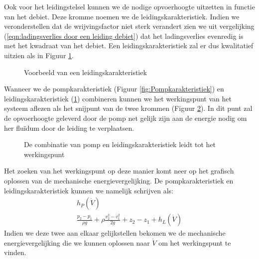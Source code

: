Ook voor het leidingstelsel kunnen we de nodige opvoerhoogte uitzetten in functie van het debiet. Deze kromme noemen we de leidingskarakteristiek. Indien we veronderstellen dat de wrijvingsfactor niet sterk verandert zien we uit vergelijking (\ref{eqn:ladingsverlies door een leiding debiet}) dat het ladingsverlies evenredig is met het kwadraat van het debiet. Een leidingskarakteristiek zal er dus kwalitatief uitzien als in Figuur \ref{fig:Leidingskarakteristiek}.
\begin{figure}
	\centering
	
	\caption{Voorbeeld van een leidingskarakteristiek}
	\label{fig:Leidingskarakteristiek}
\end{figure}
Wanneer we de pompkarakteristiek (Figuur \ref{fig:Pompkarakteristiek}) en leidingskarakteristiek (\ref{fig:Leidingskarakteristiek}) combineren kunnen we het werkingspunt van het systeem aflezen als het snijpunt van de twee krommen (Figuur \ref{fig:Pompleidingkarakteristiek}). In dit punt zal de opvoerhoogte geleverd door de pomp net gelijk zijn aan de energie nodig om her fluïdum door de leiding te verplaatsen.
\begin{figure}
	\centering
	
	\caption{De combinatie van pomp en leidingskarakteristiek leidt tot het werkingspunt}
	\label{fig:Pompleidingkarakteristiek}
\end{figure}
Het zoeken van het werkingspunt op deze manier komt neer op het grafisch oplossen van de mechanische energievergelijking. De pompkarakteristiek en leidingskarakteristiek kunnen we namelijk schrijven als:
\begin{eqnarray}
	h_P(\dot{V}) \\
	\frac{p_2-p_1}{\rho g} + \rho \frac{v_2^2-v_1^2}{2 g}  + z_2-z_1 + h_L(\dot{V})
\end{eqnarray}
Indien we deze twee aan elkaar gelijkstellen bekomen we de mechanische energievergelijking die we kunnen oplossen naar $\dot{V}$ om het werkingspunt te vinden.

